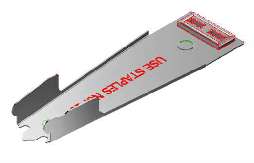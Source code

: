 \begin{minipage}{\linewidth}
\begin{minipage}[c]{0.62\linewidth}
\includegraphics[width=\linewidth,valign=t]{images/StaplerLower_PhISelections_1_model}
 \label{fig:results:staplerlowerphImodel}



\end{minipage}
\end{minipage}
